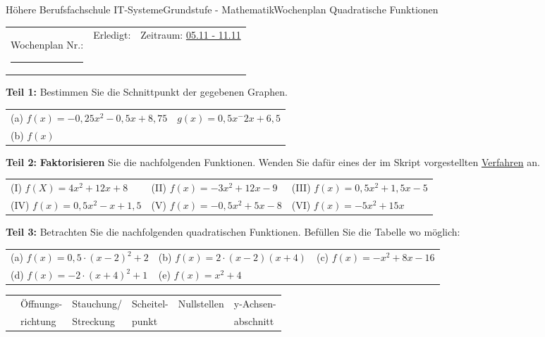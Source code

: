 \documentclass[oneside,openany,headings=optiontotoc,11pt,numbers=noenddot]{scrreprt}
\begin{document}
	\begin{worksheet}{Höhere Berufsfachschule IT-Systeme}{Grundstufe - Mathematik}{Wochenplan Quadratische Funktionen}
		\noindent
		\begin{tabularx}{\textwidth}{XXl}
			Wochenplan Nr.: \rule{0.15\textwidth}{1pt} & Erledigt: & Zeitraum: \underline{05.11 - 11.11}
		\end{tabularx}
	
		\begin{framed}
			\noindent
			\textbf{Teil 1:} Bestimmen Sie die Schnittpunkt der gegebenen Graphen.\\
			\begin{tabularx}{\textwidth}{XX}
				(a) \(f(x) = -0,25x^2-0,5x+8,75\) & \(g(x) = 0,5x^- 2x +6,5\)\\
				(b) \(f(x) \)
			\end{tabularx}
		\end{framed}
		\begin{framed}
			\noindent
			\textbf{Teil 2:} \textbf{Faktorisieren} Sie die nachfolgenden Funktionen. Wenden Sie dafür eines der im Skript vorgestellten \underline{Verfahren} an.\\
			\par\noindent
			\begin{tabularx}{\textwidth}{XXX}
				(I) \( f(X) = 4x^2 +12x+8\) & (II) \(f(x) = -3x^2 + 12x -9\) & (III) \(f(x) = 0,5x^2+1,5x-5\)\\
				(IV) \(f(x) = 0,5x^2 - x +1,5\) & (V) \(f(x) = -0,5x^2 + 5x -8\) & (VI) \(f(x) = -5x^2 + 15x\)
			\end{tabularx}
		\end{framed}
		\begin{framed}
			\noindent
			\textbf{Teil 3:} Betrachten Sie die nachfolgenden quadratischen Funktionen. Befüllen Sie die Tabelle wo möglich:\\
			\par\noindent
			\begin{tabularx}{\textwidth}{XXX}
				(a) \(f(x) = 0,5\cdot(x-2)^2 + 2\) & (b) \(f(x) = 2\cdot(x-2)(x+4)\) & (c) \(f(x) = -x^2+8x-16\)\\
				(d) \(f(x) = -2\cdot(x+4)^2+1\) &(e) \(f(x) = x^2 + 4\)\\
			\end{tabularx}
			\begin{tabularx}{\textwidth}{X|X|X|X|X|X}
				\small
				& Öffnungs- & Stauchung/ & Scheitel- & Nullstellen & y-Achsen-\\
				& richtung & Streckung & punkt & & abschnitt\\

\end{tabularx}
\end{framed}
\end{worksheet}
\end{document}
